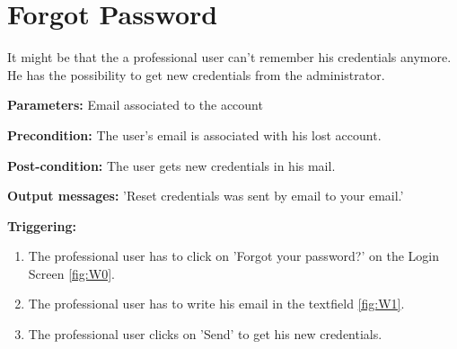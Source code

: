 \section{Forgot Password}
\label{operation:ForgotPassword}
It might be that the a professional user can't remember his credentials
anymore. He has the possibility to get new credentials from the administrator.\\
\begin{description}
\item \textbf{Parameters:}  Email associated to the account
\item \textbf{Precondition:} The user's email is associated with his lost
account.
\item \textbf{Post-condition:} The user gets new credentials in his mail.
\item \textbf{Output messages:} 'Reset credentials was sent by email to your
email.'
\item \textbf{Triggering:}
\begin{enumerate}
\item The professional user has to click on 'Forgot your password?' on the Login
Screen \ref{fig:W0}.
\item The professional user has to write his email in the textfield
\ref{fig:W1}.
\item The professional user clicks on 'Send' to get his new credentials.
\end{enumerate}
\end{description}   

